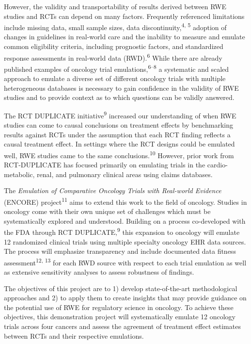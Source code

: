 \documentclass[
  letterpaper,
  DIV=11,
  numbers=noendperiod]{scrartcl}
\begin{document}
However, the validity and transportability of results derived between
RWE studies and RCTs can depend on many factors. Frequently referenced
limitations include missing data, small sample sizes, data
discontinuity,\textsuperscript{4, 5} adoption of changes in guidelines
in real-world care and the inability to measure and emulate common
eligibility criteria, including prognostic factors, and standardized
response assessments in real-world data (RWD).\textsuperscript{6} While
there are already published examples of oncology trial
emulations,\textsuperscript{6--8} a systematic and scaled approach to
emulate a diverse set of different oncology trials with multiple
heterogeneous databases is necessary to gain confidence in the validity
of RWE studies and to provide context as to which questions can be
validly answered.

The RCT DUPLICATE initiative\textsuperscript{9} increased our
understanding of when RWE studies can come to causal conclusions on
treatment effects by benchmarking results against RCTs under the
assumption that each RCT finding reflects a causal treatment effect. In
settings where the RCT designs could be emulated well, RWE studies came
to the same conclusions.\textsuperscript{10} However, prior work from
RCT-DUPLICATE has focused primarily on emulating trials in the
cardio-metabolic, renal, and pulmonary clinical areas using claims
databases.

The \emph{Emulation of Comparative Oncology Trials with Real-world
Evidence} (ENCORE) project\textsuperscript{11} aims to extend this work
to the field of oncology. Studies in oncology come with their own unique
set of challenges which must be systematically explored and understood.
Building on a process co-developed with the FDA through RCT
DUPLICATE,\textsuperscript{9} this expansion to oncology will emulate 12
randomized clinical trials using multiple specialty oncology EHR data
sources. The process will emphasize transparency and include documented
data fitness assessment\textsuperscript{12, 13} for each RWD source with
respect to each trial emulation as well as extensive sensitivity
analyses to assess robustness of findings.

The objectives of this project are to 1) develop state-of-the-art
methodological approaches and 2) to apply them to create insights that
may provide guidance on the potential use of RWE for regulatory science
in oncology. To achieve these objectives, this demonstration project
will systematically emulate 12 oncology trials across four cancers and
assess the agreement of treatment effect estimates between RCTs and
their respective emulations.
\end{document}
